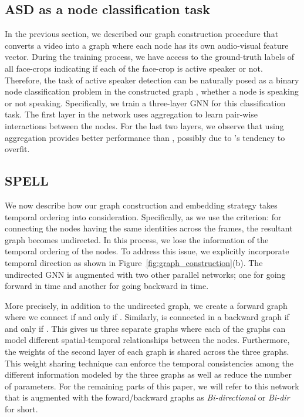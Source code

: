 \documentclass[runningheads]{llncs}
\begin{document}
\subsection{ASD as a node classification task} \label{subsec:task}
\noindent
In the previous section, we described our graph construction procedure that converts a video into a graph  where each node has its own audio-visual feature vector. During the training process, we have access to the ground-truth labels of all face-crops indicating if each of the face-crop is active speaker or not. Therefore, the task of active speaker detection can be naturally posed as a binary node classification problem in the constructed graph , whether a node is speaking or not speaking. Specifically, we train a three-layer GNN for this classification task. The first layer in the network uses  aggregation to learn pair-wise interactions between the nodes. For the last two layers, we observe that using  aggregation provides better performance than , possibly due to 's tendency to overfit.

\subsection{SPELL} \label{subsec:arch}
We now describe how our graph construction and embedding strategy takes temporal ordering into consideration. Specifically, as we use the criterion:  for connecting the nodes having the same identities across the frames, the resultant graph becomes undirected. In this process, we lose the information of the temporal ordering of the nodes. To address this issue, we explicitly incorporate temporal direction as shown in Figure~\ref{fig:graph_construction}(b). The undirected GNN is augmented with two other parallel networks; one for going forward in time and another for going backward in time. 

More precisely, in addition to the undirected graph, we create a forward graph where we connect  if and only if . Similarly,  is connected in a backward graph if and only if . This gives us three separate graphs where each of the graphs can model different spatial-temporal relationships between the nodes. Furthermore, the weights of the second layer of each graph is shared across the three graphs. This weight sharing technique can enforce the temporal consistencies among the different information modeled by the three graphs as well as reduce the number of parameters. For the remaining parts of this paper, we will refer to this network that is augmented with the foward/backward graphs as \emph{Bi-directional} or \emph{Bi-dir} for short. 
\end{document}
